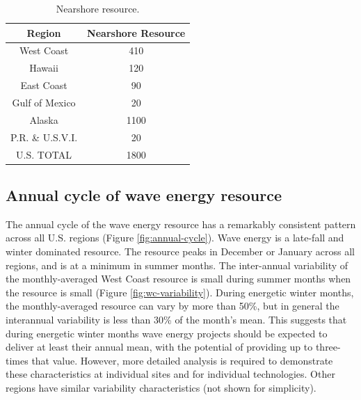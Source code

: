 
\begin{table}[ht]
  \centering
  \begin{tabular}{|c|c|}
    \hline
    Region & Nearshore Resource \\
    \hline
    West Coast & 410 \\
    Hawaii & 120 \\
    East Coast & 90 \\
    Gulf of Mexico & 20 \\
    Alaska & 1100 \\
    P.R. \& U.S.V.I. & 20 \\
    \hline \hline
    U.S. TOTAL & 1800 \\
    \hline
  \end{tabular}
  \caption{Nearshore resource. }
  \label{tab:nearshore-total}
\end{table}

\subsection{Annual cycle of wave energy resource}

The annual cycle of the wave energy resource has a remarkably consistent pattern across all U.S. regions (Figure \ref{fig:annual-cycle}). Wave energy is a late-fall and winter dominated resource. The resource peaks in December or January across all regions, and is at a minimum in summer months. The inter-annual variability of the monthly-averaged West Coast resource is small during summer months when the resource is small (Figure \ref{fig:wc-variability}). During energetic winter months, the monthly-averaged resource can vary by more than 50\%, but in general the interannual variability is less than 30\% of the month's mean. This suggests that during energetic winter months wave energy projects should be expected to deliver at least their annual mean, with the potential of providing up to three-times that value.  However, more detailed analysis is required to demonstrate these characteristics at individual sites and for individual technologies. Other regions have similar variability characteristics (not shown for simplicity).

